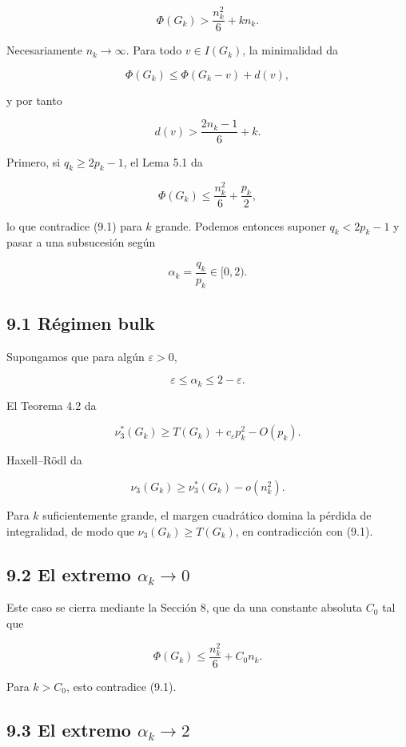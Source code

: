\documentclass[
  11pt,
]{article}
\begin{document}
\[
\Phi(G_k)
>
\frac{n_k^2}{6}+kn_k.
\tag{9.1}
\]

Necesariamente \(n_k\to\infty\). Para todo \(v\in I(G_k)\), la
minimalidad da

\[
\Phi(G_k)
\le
\Phi(G_k-v)+d(v),
\]

y por tanto

\[
\boxed{
d(v)>
\frac{2n_k-1}{6}+k.
}
\tag{9.2}
\]

Primero, si \(q_k\ge2p_k-1\), el Lema 5.1 da

\[
\Phi(G_k)
\le
\frac{n_k^2}{6}+\frac{p_k}{2},
\]

lo que contradice (9.1) para \(k\) grande. Podemos entonces suponer
\(q_k<2p_k-1\) y pasar a una subsucesión según

\[
\alpha_k=\frac{q_k}{p_k}\in[0,2).
\]

\subsection{9.1 Régimen bulk}\label{ruxe9gimen-bulk}

Supongamos que para algún \(\varepsilon>0\),

\[
\varepsilon\le\alpha_k\le2-\varepsilon.
\]

El Teorema 4.2 da

\[
\nu_3^*(G_k)
\ge
T(G_k)+c_\varepsilon p_k^2-O(p_k).
\]

Haxell--Rödl da

\[
\nu_3(G_k)
\ge
\nu_3^*(G_k)-o(n_k^2).
\]

Para \(k\) suficientemente grande, el margen cuadrático domina la
pérdida de integralidad, de modo que \(\nu_3(G_k)\ge T(G_k)\), en
contradicción con (9.1).

\subsection{\texorpdfstring{9.2 El extremo
\(\alpha_k\to0\)}{9.2 El extremo \textbackslash alpha\_k\textbackslash to0}}\label{el-extremo-alpha_kto0}

Este caso se cierra mediante la Sección 8, que da una constante absoluta
\(C_0\) tal que

\[
\Phi(G_k)
\le
\frac{n_k^2}{6}+C_0n_k.
\]

Para \(k>C_0\), esto contradice (9.1).

\subsection{\texorpdfstring{9.3 El extremo
\(\alpha_k\to2\)}{9.3 El extremo \textbackslash alpha\_k\textbackslash to2}}\label{el-extremo-alpha_kto2}
\end{document}
